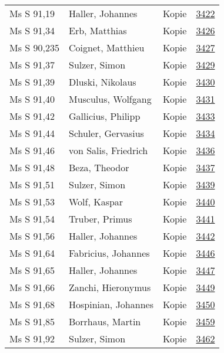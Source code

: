 \documentclass[10pt,a4paper,landscape]{report}
\begin{document}
\begin{longtable}{p{16cm}p{4cm}lr}
Ms S 91,19	&	Haller, Johannes	&	Kopie	&	\href{http://130.60.24.72/assignment/3422}{3422}\\
Ms S 91,34	&	Erb, Matthias	&	Kopie	&	\href{http://130.60.24.72/assignment/3426}{3426}\\
Ms S 90,235	&	Coignet, Matthieu	&	Kopie	&	\href{http://130.60.24.72/assignment/3427}{3427}\\
Ms S 91,37	&	Sulzer, Simon	&	Kopie	&	\href{http://130.60.24.72/assignment/3429}{3429}\\
Ms S 91,39	&	Dluski, Nikolaus	&	Kopie	&	\href{http://130.60.24.72/assignment/3430}{3430}\\
Ms S 91,40	&	Musculus, Wolfgang	&	Kopie	&	\href{http://130.60.24.72/assignment/3431}{3431}\\
Ms S 91,42	&	Gallicius, Philipp	&	Kopie	&	\href{http://130.60.24.72/assignment/3433}{3433}\\
Ms S 91,44	&	Schuler, Gervasius	&	Kopie	&	\href{http://130.60.24.72/assignment/3434}{3434}\\
Ms S 91,46	&	von Salis, Friedrich	&	Kopie	&	\href{http://130.60.24.72/assignment/3436}{3436}\\
Ms S 91,48	&	Beza, Theodor	&	Kopie	&	\href{http://130.60.24.72/assignment/3437}{3437}\\
Ms S 91,51	&	Sulzer, Simon	&	Kopie	&	\href{http://130.60.24.72/assignment/3439}{3439}\\
Ms S 91,53	&	Wolf, Kaspar	&	Kopie	&	\href{http://130.60.24.72/assignment/3440}{3440}\\
Ms S 91,54	&	Truber, Primus	&	Kopie	&	\href{http://130.60.24.72/assignment/3441}{3441}\\
Ms S 91,56	&	Haller, Johannes	&	Kopie	&	\href{http://130.60.24.72/assignment/3442}{3442}\\
Ms S 91,64	&	Fabricius, Johannes	&	Kopie	&	\href{http://130.60.24.72/assignment/3446}{3446}\\
Ms S 91,65	&	Haller, Johannes	&	Kopie	&	\href{http://130.60.24.72/assignment/3447}{3447}\\
Ms S 91,66	&	Zanchi, Hieronymus	&	Kopie	&	\href{http://130.60.24.72/assignment/3449}{3449}\\
Ms S 91,68	&	Hospinian, Johannes	&	Kopie	&	\href{http://130.60.24.72/assignment/3450}{3450}\\
Ms S 91,85	&	Borrhaus, Martin	&	Kopie	&	\href{http://130.60.24.72/assignment/3459}{3459}\\
Ms S 91,92	&	Sulzer, Simon	&	Kopie	&	\href{http://130.60.24.72/assignment/3462}{3462}\\

\end{longtable}
\end{document}
